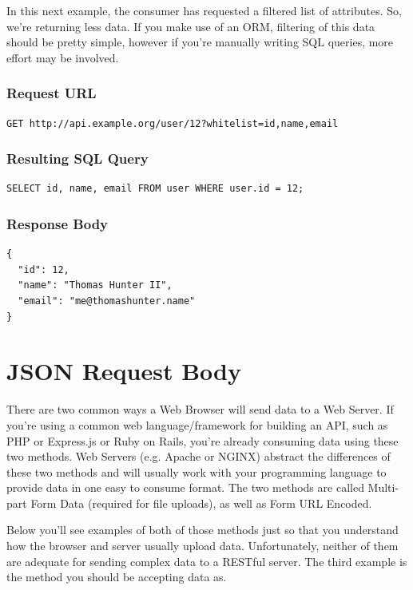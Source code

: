 \documentclass{book}
\begin{document}
In this next example, the consumer has requested a filtered list of attributes. So, we're returning less data. If you make use of an ORM, filtering of this data should be pretty simple, however if you're manually writing SQL queries, more effort may be involved.

\subsubsection{Request URL}

\begin{verbatim}
GET http://api.example.org/user/12?whitelist=id,name,email
\end{verbatim}

\subsubsection{Resulting SQL Query}

\begin{verbatim}
SELECT id, name, email FROM user WHERE user.id = 12;
\end{verbatim}

\subsubsection{Response Body}

\begin{verbatim}
{
  "id": 12,
  "name": "Thomas Hunter II",
  "email": "me@thomashunter.name"
}
\end{verbatim}


\section{JSON Request Body}

There are two common ways a Web Browser will send data to a Web Server. If you're using a common web language/framework for building an API, such as PHP or Express.js or Ruby on Rails, you're already consuming data using these two methods. Web Servers (e.g. Apache or NGINX) abstract the differences of these two methods and will usually work with your programming language to provide data in one easy to consume format. The two methods are called Multi-part Form Data (required for file uploads), as well as Form URL Encoded.

Below you'll see examples of both of those methods just so that you understand how the browser and server usually upload data. Unfortunately, neither of them are adequate for sending complex data to a RESTful server. The third example is the method you should be accepting data as.
\end{document}

